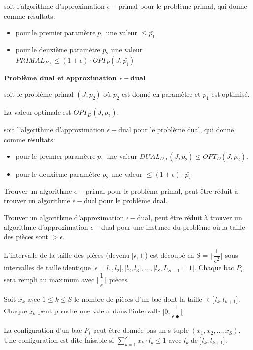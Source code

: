\documentclass[a4paper,12pt]{report}
\theoremstyle{plain}				%
\theoremstyle{definition}				%
\begin{document}
soit l'algorithme d'approximation $\epsilon-$primal pour le problème primal, qui donne comme résultats:

\begin{itemize}
\item pour le premier paramètre $p_1$ une valeur $\le \bar{p_1}$
\item pour le deuxième paramètre $p_2$ une valeur $PRIMAL_{P,\epsilon} \le (1+\epsilon)\cdot OPT_P(J,\bar{p_1})$
\end{itemize}
\bigskip

\textbf{Problème dual et approximation $\epsilon-$dual}

soit le problème primal $(J,\bar{p_2})$
où $p_2$ est donné en paramètre et $p_1$ est optimisé.

La valeur optimale est $OPT_D(J,\bar{p_2})$.

soit l'algorithme d'approximation $\epsilon-$dual pour le problème dual, qui donne comme résultats:

\begin{itemize}
\item pour le premier paramètre $p_1$ une valeur $DUAL_{D,\epsilon}(J, \bar{p_2})\le OPT_D(J,\bar{p_2})$.
\item pour le deuxième paramètre $p_2$ une valeur $ \le (1+\epsilon)\cdot \bar{p_2}$
\end{itemize}

\bigskip

Trouver un algorithme $\epsilon-$primal pour le problème primal,
peut être réduit à trouver un algorithme $\epsilon-$dual pour le problème dual.

Trouver un algorithme d'approximation $\epsilon-$dual, peut être réduit à trouver un algorithme
d'approximation $\epsilon-$dual pour une instance du problème où la taille des pièces sont $> \epsilon$.

L'intervalle de la taille des pièces (devenu $]\epsilon, 1]$) est
découpé en S = $\lceil \dfrac{1}{\epsilon^2}\rceil$ sous intervalles
de taille identique
$]\epsilon = l_1, l_2], ]l_2, l_3], \ldots , ]l_S, L_{S+1}=1]$.
Chaque bac $P_i$, sera rempli au maximum avec
$\lfloor \dfrac{1}{\epsilon} \lfloor$ pièces.

Soit $x_k$ avec $1 \le k \le S$ le nombre de pièces d'un bac dont la
taille $\in ]l_k, l_{k+1}]$.
Chaque $x_k$ peut prendre une valeur dans l'intervalle
$[0,\dfrac{1}{\epsilon•}[$

La configuration d'un bac $P_i$ peut être donnée pas un s-tuple $(x_1, x_2, \ldots, x_S)$.
Une configuration est dite faisable si $\sum_{k=1}^{S}x_k \cdot l_k \le 1$ avec $l_k$ de $]l_k, l_{k+1}]$.
\end{document}
